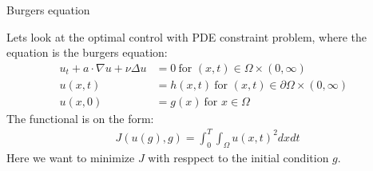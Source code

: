 \documentclass[11pt,a4paper]{report}
\begin{document}
\begin{center}

\LARGE Burgers equation


\end{center}

Lets look at the optimal control with PDE constraint problem, where the equation is the burgers equation:
\begin{align*}
u_t + a\cdot \nabla u + \nu\Delta u &= 0 \ \text{for $(x,t)\in \Omega\times(0,\infty)$}\\
u(x,t) &= h(x,t) \ \text{for $(x,t) \in\partial\Omega\times(0,\infty)$ } \\
u(x,0) &= g(x) \ \text{for $x \in\Omega$ }
\end{align*} 
The functional is on the form:
\begin{align*}
J(u(g),g) = \int_0^T\int_{\Omega} u(x,t)^2 dxdt
\end{align*}
Here we want to minimize $J$ with resppect to the initial condition $g$.
\end{document}
